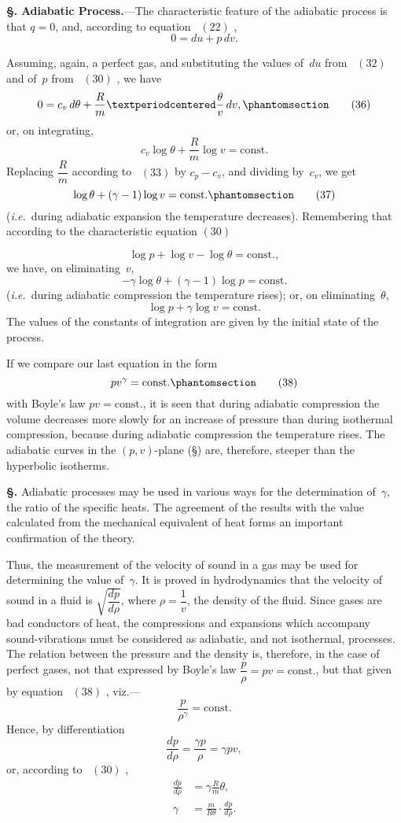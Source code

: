 \documentclass[12pt]{book}[2005/09/16]
\newcommand{\Chg}[2]{#2}
\newcommand{\Add}[1]{\Chg{}{#1}}
\newcommand{\Section}[1]{
  \medskip\par\textbf{§\;#1}
  \label{section:#1}
}
\newcommand{\SecRef}[2][§\;]{\hyperref[section:#2.]{{\upshape #1#2}}}
\newcommand{\Tag}[1]{%
  \phantomsection\label{eqn:#1}\tag*{\ensuremath{#1}}%
}
\newcommand{\Eq}[1]{%
  \hyperref[eqn:#1]{\ensuremath{#1}}%
}
\newcommand{\PageSep}[1]{\ignorespaces}
\newcommand{\Topic}[1]{\textbf{#1}}
\newcommand{\const}{\text{const.}}
\newcommand{\ie}{\emph{i.e.}}
\begin{document}
\Section{88.} \Topic{Adiabatic Process.}---The characteristic feature
%
of the adiabatic process is that $q = 0$, and, according to
equation~\Eq{(22)},
\[
0 = du + p\, dv.
\]
\PageSep{60}

Assuming, again, a perfect gas, and substituting the
values of~$du$ from~\Eq{(32)} and of~$p$ from~\Eq{(30)}, we have
\[
0 = c_{v}\, d\theta + \frac{R}{m} · \frac{\theta}{v}\, dv,
\Tag{(36)}
\]
or, on integrating,
\[
c_{v} \log\theta + \frac{R}{m} \log v = \const
\]
Replacing $\dfrac{R}{m}$ according to~\Eq{(33)} by $c_{p} - c_{v}$, and dividing
by~$c_{v}$, we get
\[
\log \theta + (\gamma - 1) \log v = \const
\Tag{(37)}
\]
(\ie\ during adiabatic expansion the temperature decreases)\Add{.}
Remembering that according to the characteristic equation\Eq{(30)}
\[
\log p + \log v - \log \theta = \const,
\]
we have, on eliminating~$v$,
\[
-\gamma \log \theta + (\gamma - 1) \log p = \const
\]
(\ie\ during adiabatic compression the temperature rises);
or, on eliminating~$\theta$,
\[
\log p + \gamma \log v = \const
\]
The values of the constants of integration are given by
the initial state of the process.

If we compare our last equation in the form
\[
pv^{\gamma} = \const
\Tag{(38)}
\]
with Boyle's law $pv = \const$, it is seen that during adiabatic
compression the volume decreases more slowly for an increase
of pressure than during isothermal compression,
because during adiabatic compression the temperature rises.
The adiabatic curves in the $\Chg{pv}{(p, v)}$-plane (\SecRef{22}) are, therefore,
steeper than the hyperbolic isotherms.

\Section{89.} Adiabatic processes may be used in various ways
\PageSep{61}
for the determination of~$\gamma$, the ratio of the specific heats.
The agreement of the results with the value calculated from
the mechanical equivalent of heat forms an important
confirmation of the theory.

Thus, the measurement of the velocity of sound in a gas
%
may be used for determining the value of~$\gamma$. It is proved
in hydrodynamics that the velocity of sound in a fluid is
$\sqrt{\dfrac{dp}{d\rho}}$, where $\rho = \dfrac{1}{v}$, the density of the fluid. Since gases
are bad conductors of heat, the compressions and expansions
which accompany sound-vibrations must be considered as
adiabatic, and not isothermal, processes. The relation
between the pressure and the density is, therefore, in
the case of perfect gases, not that expressed by Boyle's
law $\dfrac{p}{\rho} = pv = \const$, but that given by equation~\Eq{(38)}, viz.---
\[
\frac{p}{\rho^{\gamma}} = \const
\]
Hence, by differentiation
\[
\frac{dp}{d\rho} = \frac{\gamma p}{\rho} = \gamma pv,
\]
or, according to~\Eq{(30)},
\begin{align*}
\frac{dp}{d\rho} &= \gamma \frac{R}{m} \theta, \\
\gamma &= \frac{m}{R\theta} · \frac{dp}{d\rho}.
\end{align*}
\end{document}
